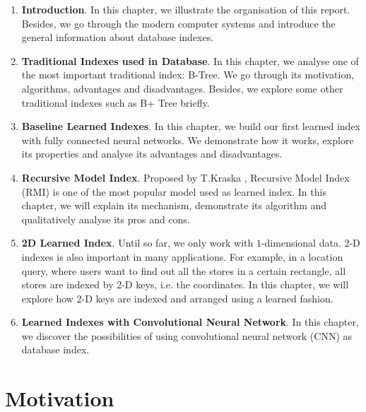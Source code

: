 \begin{enumerate}
	\item \textbf{Introduction}. In this chapter, we illustrate the organisation of this report. Besides, we go through the modern computer systems and introduce the general information about database indexes. 
	\item \textbf{Traditional Indexes used in Database}. In this chapter, we analyse one of the most important traditional index: B-Tree. We go through its motivation, algorithms, advantages and disadvantages. Besides, we explore some other traditional indexes such as B+ Tree briefly.
	\item \textbf{Baseline Learned Indexes}. In this chapter, we build our first learned index with fully connected neural networks. We demonstrate how it works, explore its properties and analyse its advantages and disadvantages. 
	\item \textbf{Recursive Model Index}. Proposed by T.Kraska \cite{kraska2018case},  Recursive Model Index (RMI) is one of the most popular model used as learned index. In this chapter, we will explain its mechanism, demonstrate its algorithm and qualitatively analyse its pros and cons. 
	\item \textbf{2D Learned Index}. Until so far, we only work with $1$-dimensional data. 2-D indexes is also important in many applications. For example, in a location query, where users want to find out all the stores in a certain rectangle, all stores are indexed by 2-D keys, i.e. the coordinates. In this chapter, we will explore how 2-D keys are indexed and arranged using a learned fashion.
	\item \textbf{Learned Indexes with Convolutional Neural Network}. In this chapter, we discover the possibilities of using convolutional neural network (CNN) as database index. 
\end{enumerate}

\section{Motivation}

